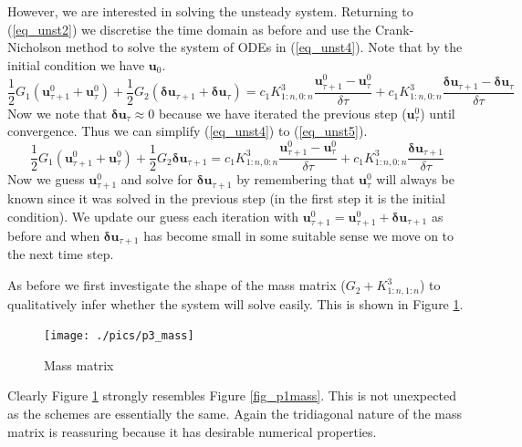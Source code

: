 \documentclass[11pt,fleqn]{article}
\theoremstyle{defstyle}
\begin{document}
However, we are interested in solving the unsteady system. Returning to (\ref{eq_unst2}) we discretise the time domain as before and use the Crank-Nicholson method to solve the system of ODEs in (\ref{eq_unst4}). Note that by the initial condition we have $\mathbf{u}_0$. 
\begin{equation}
\frac{1}{2} G_1\left(\mathbf{u}^0_{\tau+1}+\mathbf{u}^0_{\tau}\right) + \frac{1}{2}G_2\left(\mathbf{\delta u}_{\tau+1}+\mathbf{\delta u}_{\tau}\right) =c_1K^3_{1:n,0:n}\frac{\mathbf{u}^0_{\tau + 1}-\mathbf{u}^0_{\tau}}{\delta \tau} + c_1K^3_{1:n,0:n}\frac{\mathbf{\delta u}_{\tau + 1}-\mathbf{\delta u}_{\tau }}{\delta \tau}
\label{eq_unst4}
\end{equation}
Now we note that $\mathbf{\delta u}_{\tau} \approx 0$ because we have iterated the previous step ($\mathbf{u}^0_{\tau}$) until convergence. Thus we can simplify (\ref{eq_unst4}) to (\ref{eq_unst5}).
\begin{equation}
\frac{1}{2} G_1\left(\mathbf{u}^0_{\tau+1}+\mathbf{u}^0_{\tau}\right) + \frac{1}{2}G_2\mathbf{\delta u}_{\tau+1} =c_1K^3_{1:n,0:n}\frac{\mathbf{u}^0_{\tau + 1}-\mathbf{u}^0_{\tau}}{\delta \tau} + c_1K^3_{1:n,0:n}\frac{\mathbf{\delta u}_{\tau + 1}}{\delta \tau}
\label{eq_unst5}
\end{equation}
Now we guess $\mathbf{u}^0_{\tau+1}$ and solve for $\mathbf{\delta u}_{\tau+1}$ by remembering that $\mathbf{u}^0_{\tau}$ will always be known since it was solved in the previous step (in the first step it is the initial condition). We update our guess each iteration with  $\mathbf{u}^0_{\tau+1} = \mathbf{u}^0_{\tau+1} + \mathbf{\delta u}_{\tau+1}$ as before and when $\mathbf{\delta u}_{\tau+1}$ has become small in some suitable sense we move on to the next time step.

As before we first investigate the shape of the mass matrix ($G_2+K^3_{1:n,1:n}$) to qualitatively infer whether the system will solve easily. This is shown in Figure \ref{fig_p3mass}.
\begin{figure}[H] 
\centering
\texttt{[image: ./pics/p3\_mass]}
\caption{Mass matrix} 
\label{fig_p3mass}
\end{figure}
Clearly Figure \ref{fig_p3mass} strongly resembles Figure \ref{fig_p1mass}. This is not unexpected as the schemes are essentially the same. Again the tridiagonal nature of the mass matrix is reassuring because it has desirable numerical properties.
\end{document}
